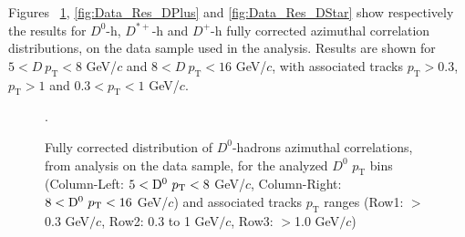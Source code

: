 \begin{comment}

 \caption{Corrected azimuthal correlation 2D plots in different $\text{D}^+$ $\text{p}_T$ regions. Left: $3< p_{T}^{\text{D}^+}< 5 GeV/c$, Mid: $5< p_{T}^{\text{D}^+}< 8 GeV/c$ , High: $8< p_{T}^{\text{D}^+}< 16 GeV/c$  for associated $p_\text{T}$ threshold of 0.3 GeV/$c$ (upper row), $p_\text{T}$ threshold of 0.5 GeV/$c$ (middle row) and $p_\text{T}$ threshold of 1.0 GeV/$c$ (bottom row).}
\label{fig:Dpluscorr2D}
\end{figure}

\begin{figure}[h]
\centering
 \caption{Corrected azimuthal correlation 2D plots in different $\text{D}^+$ $\text{p}_T$ regions. Left: $5< p_{T}^{\text{D}^+}< 8 GeV/c$ , High: $8< p_{T}^{\text{D}^+}< 16 GeV/c$  for associated $p_\text{T}$ range 0.3 - 1.0 GeV/$c$}
\label{fig:Dpluscorr2D_newpT}
\end{figure}
\end{comment}

Figures ~\ref{fig:Data_Res_D0}, \ref{fig:Data_Res_DPlus}  and \ref{fig:Data_Res_DStar} show respectively the results for $D^0$-h, $D^{*+}$-h and $D^+$-h fully corrected azimuthal correlation distributions, on the data sample used in the analysis. Results are shown for $5 < D\ p_\text{T} < 8$ GeV/$c$ and $8 < D \ p_\text{T} < 16$ GeV/$c$, with associated tracks $p_\text{T} > 0.3$, $p_\text{T} > 1$ and $0.3 < p_\text{T} < 1$ GeV/$c$.

\begin{figure}[h]
\centering
\caption{Fully corrected distribution of $D^0$-hadrons azimuthal correlations, from analysis on the data sample, for the analyzed $D^0$ $p_\text{T}$ bins (Column-Left: $5 < {\rm D^0} \ p_\text{T} < 8$ GeV/$c$, Column-Right: $8 < {\rm D^0} \ p_\text{T} < 16$ GeV/$c$) and associated tracks $p_\text{T}$ ranges (Row1: $>$0.3 GeV$/c$, Row2: 0.3 to 1 GeV$/c$, Row3: $>$1.0 GeV$/c$)}.
\label{fig:Data_Res_D0}
\end{figure}

